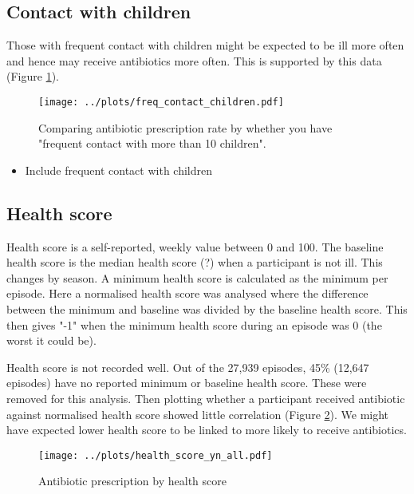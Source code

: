 \documentclass{article}
\begin{document}
\subsection{Contact with children}

Those with frequent contact with children might be expected to be ill more often and hence may receive antibiotics more often. This is supported by this data (Figure \ref{fig:childf}). 

	\begin{figure}[htbp]
		\centering
		\texttt{[image: ../plots/freq\_contact\_children.pdf]}
		\caption{Comparing antibiotic prescription rate by whether you have "frequent contact with more than 10 children". }
		\label{fig:childf}
	\end{figure} 

	\begin{itemize}
	\item Include frequent contact with children
\end{itemize}

\subsection{Health score}

Health score is a self-reported, weekly value between 0 and 100. The baseline health score is the median health score (?) when a participant is not ill. This changes by season. A minimum health score is calculated as the minimum per episode. Here a normalised health score was analysed where the difference between the minimum and baseline was divided by the baseline health score. This then gives "-1" when the minimum health score during an episode was 0 (the worst it could be). 

Health score is not recorded well. Out of the 27,939 episodes, 45\% (12,647 episodes) have no reported minimum or baseline health score. These were removed for this analysis. Then plotting whether a participant received antibiotic against normalised health score showed little correlation (Figure \ref{fig:hsf}). We might have expected lower health score to be linked to more likely to receive antibiotics. 

	\begin{figure}[htbp]
		\centering
		\texttt{[image: ../plots/health\_score\_yn\_all.pdf]}
		\caption{Antibiotic prescription by health score}
		\label{fig:hsf}
	\end{figure} 
\end{document}
